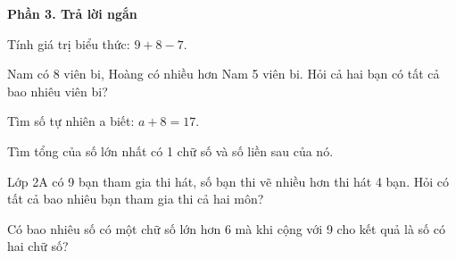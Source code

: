 \textbf{Phần 3. Trả lời ngắn}

\begin{ex} %
Tính giá trị biểu thức: $9 + 8 - 7$.
\end{ex}

\begin{ex} %
Nam có 8 viên bi, Hoàng có nhiều hơn Nam 5 viên bi. Hỏi cả hai bạn có tất cả bao nhiêu viên bi?
\end{ex}

\begin{ex} %
Tìm số tự nhiên a biết: $a + 8 = 17$.
\end{ex}

\begin{ex} %
Tìm tổng của số lớn nhất có 1 chữ số và số liền sau của nó.
\end{ex}

\begin{ex} %
Lớp 2A có 9 bạn tham gia thi hát, số bạn thi vẽ nhiều hơn thi hát 4 bạn. Hỏi có tất cả bao nhiêu bạn tham gia thi cả hai môn?
\end{ex}

\begin{ex} %
Có bao nhiêu số có một chữ số lớn hơn 6 mà khi cộng với 9 cho kết quả là số có hai chữ số?
\end{ex}
